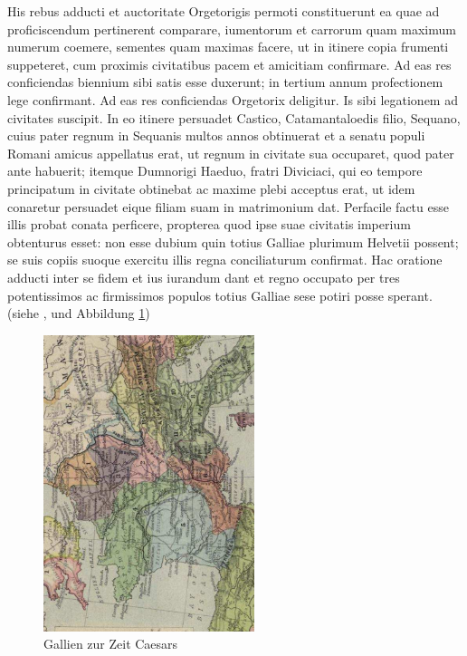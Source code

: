 His rebus adducti et auctoritate Orgetorigis permoti constituerunt
ea quae ad proficiscendum pertinerent comparare, iumentorum et
carrorum quam maximum numerum coemere, sementes quam maximas
facere, ut in itinere copia frumenti suppeteret, cum proximis
civitatibus pacem et amicitiam confirmare. Ad eas res conficiendas
biennium sibi satis esse duxerunt; in tertium annum profectionem
lege confirmant. Ad eas res conficiendas Orgetorix deligitur. Is
sibi legationem ad civitates suscipit. In eo itinere persuadet
Castico, Catamantaloedis filio, Sequano, cuius pater regnum in
Sequanis multos annos obtinuerat et a senatu populi Romani amicus
appellatus erat, ut regnum in civitate sua occuparet, quod pater
ante habuerit; itemque Dumnorigi Haeduo, fratri Diviciaci, qui eo
tempore principatum in civitate obtinebat ac maxime plebi acceptus
erat, ut idem conaretur persuadet eique filiam suam in matrimonium
dat. Perfacile factu esse illis probat conata perficere, propterea
quod ipse suae civitatis imperium obtenturus esset: non esse
dubium quin totius Galliae plurimum Helvetii possent; se suis
copiis suoque exercitu illis regna conciliaturum confirmat. Hac
oratione adducti inter se fidem et ius iurandum dant et regno
occupato per tres potentissimos ac firmissimos populos totius
Galliae sese potiri posse sperant. (siehe \cite{Con97},
\cite{PeHe97} und Abbildung \ref{fig_Gallien})


\begin{figure}[htb]
\begin{center}
  \includegraphics[width=175pt, angle=270]{bilder/Galia}
  \caption{Gallien zur Zeit Caesars}\label{fig_Gallien}
\end{center}
\end{figure}



